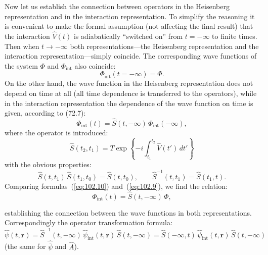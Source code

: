 Now let us establish the connection between operators in the Heisenberg representation and in the interaction representation. To simplify the reasoning it is convenient to make the formal assumption (not affecting the final result) that the interaction $\hat{V}(t)$ is adiabatically ``switched on'' from $t = -\infty$ to finite times. Then when $t \to -\infty$ both representations---the Heisenberg representation and the interaction representation---simply coincide. The corresponding wave functions of the system $\Phi$ and $\Phi_{\mathrm{int}}$ also coincide:
\begin{equation}
\Phi_{\mathrm{int}}(t = -\infty) = \Phi.
\label{eq:102.9}
\end{equation}
On the other hand, the wave function in the Heisenberg representation does not depend on time at all (all time dependence is transferred to the operators), while in the interaction representation the dependence of the wave function on time is given, according to (72.7):
\begin{equation}
\Phi_{\mathrm{int}}(t) = \hat{S}(t, -\infty)\,\Phi_{\mathrm{int}}(-\infty),
\label{eq:102.10}
\end{equation}
where the operator is introduced:
\begin{equation}
\hat{S}(t_2, t_1) = T\exp\!\left\{-i\int_{t_1}^{t_2}\hat{V}(t')\,dt'\right\}
\label{eq:102.11}
\end{equation}
with the obvious properties:
\begin{equation}
\hat{S}(t, t_1)\,\hat{S}(t_1, t_0) = \hat{S}(t, t_0), \qquad \hat{S}^{-1}(t, t_1) = \hat{S}(t_1, t).
\label{eq:102.12}
\end{equation}
Comparing formulas~(\ref{eq:102.10}) and~(\ref{eq:102.9}), we find the relation:
\begin{equation}
\Phi_{\mathrm{int}}(t) = \hat{S}(t, -\infty)\,\Phi,
\label{eq:102.13}
\end{equation}


\noindent establishing the connection between the wave functions in both representations. Correspondingly the operator transformation formula:
\begin{equation}
\hat{\psi}(t, \mathbf{r}) = \hat{S}^{-1}(t, -\infty)\,\hat{\psi}_{\mathrm{int}}(t, \mathbf{r})\,\hat{S}(t, -\infty) = \hat{S}(-\infty, t)\,\hat{\psi}_{\mathrm{int}}(t, \mathbf{r})\,\hat{S}(t, -\infty)
\label{eq:102.14}
\end{equation}
(the same for $\hat{\bar{\psi}}$ and $\hat{A}$).

